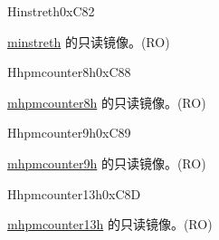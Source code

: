 \begin{register}{H}{instreth}{0xC82}\label{regdesc:INSTRETH}
%
\regnewline%
\begin{regdesc}\begin{reglist}
\label{fielddesc:INSTRETH}\item [INSTRETH] \hyperref[regdesc:MINSTRETH]{minstreth} 的只读镜像。(RO)
\end{reglist}\end{regdesc}
\end{register}

\begin{register}{H}{hpmcounter8h}{0xC88}\label{regdesc:HPMCOUNTER8H}
%
\regnewline%
\begin{regdesc}\begin{reglist}
\label{fielddesc:HPMCOUNTER8H}\item [HPMCOUNTER8H] \hyperref[regdesc:MHPMCOUNTER8H]{mhpmcounter8h} 的只读镜像。(RO)
\end{reglist}\end{regdesc}
\end{register}

\begin{register}{H}{hpmcounter9h}{0xC89}\label{regdesc:HPMCOUNTER9H}
%
\regnewline%
\begin{regdesc}\begin{reglist}
\label{fielddesc:HPMCOUNTER9H}\item [HPMCOUNTER9H] \hyperref[regdesc:MHPMCOUNTER9H]{mhpmcounter9h} 的只读镜像。(RO)
\end{reglist}\end{regdesc}
\end{register}


\begin{register}{H}{hpmcounter13h}{0xC8D}\label{regdesc:HPMCOUNTER13H}
%
\regnewline%
\begin{regdesc}\begin{reglist}
\label{fielddesc:HPMCOUNTER13H}\item [HPMCOUNTER13H] \hyperref[regdesc:MHPMCOUNTER13H]{mhpmcounter13h} 的只读镜像。(RO)
\end{reglist}\end{regdesc}
\end{register}

